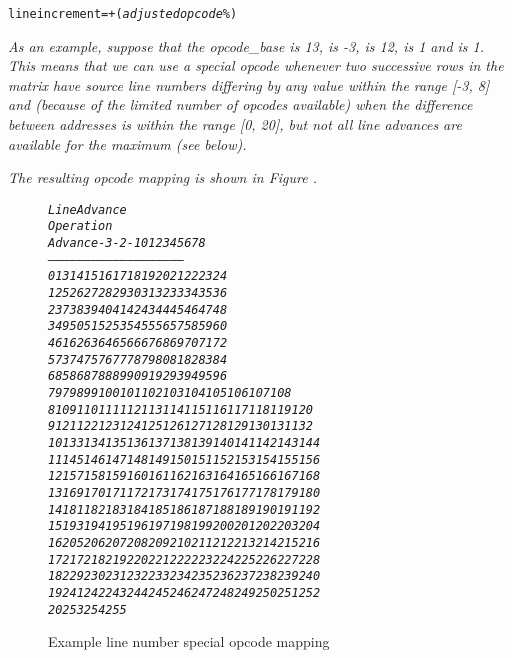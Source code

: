 \begin{alltt}
  line increment =  + (\textit{adjusted opcode} \% )
\end{alltt}

\textit{As an example, suppose that the opcode\_base is 13, 
is -3,  is 12, 
 is 1
and 
 is 1. 
This means that
we can use a special opcode whenever two successive rows in
the matrix have source line numbers differing by any value
within the range [-3, 8] and (because of the limited number
of opcodes available) when the difference between addresses
is within the range [0, 20], but not all line advances are
available for the maximum  (see below).}

\textit{The resulting opcode mapping is shown in
Figure .}

\begin{figure}[ht]
\begin{alltt}\textit{
                        Line Advance
   Operation  
     Advance    -3  -2  -1   0   1   2   3   4   5   6   7   8
   ---------   -----------------------------------------------
           0    13  14  15  16  17  18  19  20  21  22  23  24
           1    25  26  27  28  29  30  31  32  33  34  35  36
           2    37  38  39  40  41  42  43  44  45  46  47  48
           3    49  50  51  52  53  54  55  56  57  58  59  60
           4    61  62  63  64  65  66  67  68  69  70  71  72
           5    73  74  75  76  77  78  79  80  81  82  83  84
           6    85  86  87  88  89  90  91  92  93  94  95  96
           7    97  98  99 100 101 102 103 104 105 106 107 108
           8   109 110 111 112 113 114 115 116 117 118 119 120
           9   121 122 123 124 125 126 127 128 129 130 131 132
          10   133 134 135 136 137 138 139 140 141 142 143 144
          11   145 146 147 148 149 150 151 152 153 154 155 156
          12   157 158 159 160 161 162 163 164 165 166 167 168
          13   169 170 171 172 173 174 175 176 177 178 179 180
          14   181 182 183 184 185 186 187 188 189 190 191 192
          15   193 194 195 196 197 198 199 200 201 202 203 204
          16   205 206 207 208 209 210 211 212 213 214 215 216
          17   217 218 219 220 221 222 223 224 225 226 227 228 
          18   229 230 231 232 233 234 235 236 237 238 239 240 
          19   241 242 243 244 245 246 247 248 249 250 251 252
          20   253 254 255
}\end{alltt}
\caption{Example line number special opcode mapping}
\label{fig:examplelinenumberspecialopcodemapping}
\end{figure}

